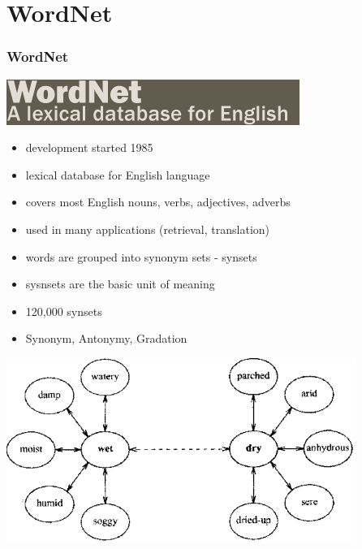 \section{WordNet}
\begin{frame}
\frametitle{WordNet}
\includegraphics[scale=0.35]{img/wordnet_logo.png}
\begin{itemize}
\item development started 1985
\item lexical database for English language
\item covers most English nouns, verbs, adjectives, adverbs
\item used in many applications (retrieval, translation)
\end{itemize}
\end{frame}

\begin{frame}
\begin{itemize}
\frametitle{Synsets}
\item words are grouped into synonym sets - synsets
\item sysnsets are the basic unit of meaning
\item 120,000 synsets
\item Synonym, Antonymy, Gradation
\end{itemize}
\includegraphics[scale=0.55]{img/wordnet-syn.png}
\end{frame}

